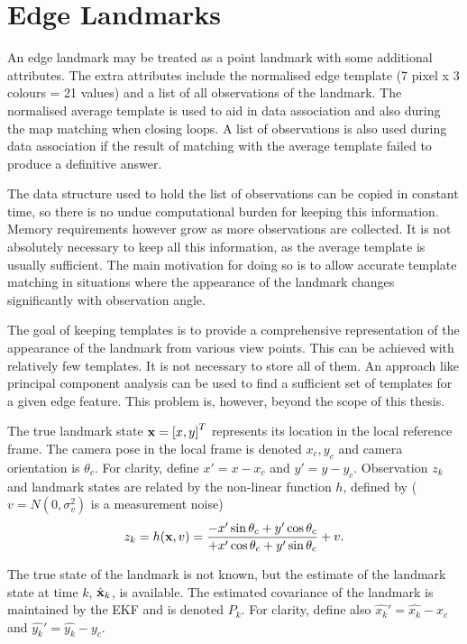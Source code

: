 \section{Edge Landmarks}

An edge landmark may be treated as a point landmark with some
additional attributes. The extra attributes include the normalised
edge template (7 pixel x 3 colours = 21 values) and a list of all
observations of the landmark.  The normalised average template is used
to aid in data association and also during the map matching when
closing loops. A list of observations is also used during data
association if the result of matching with the average template failed
to produce a definitive answer.

The data structure used to hold the list of observations can be copied
in constant time, so there is no undue computational burden for
keeping this information. Memory requirements however grow as more
observations are collected. It is not absolutely necessary to keep all
this information, as the average template is usually sufficient. The
main motivation for doing so is to allow accurate template matching in
situations where the appearance of the landmark changes significantly
with observation angle.

The goal of keeping templates is to provide a comprehensive
representation of the appearance of the landmark from various view
points. This can be achieved with relatively few templates. It is not
necessary to store all of them. An approach like principal component
analysis \cite{jolliffe2002pca} can be used to find a sufficient set
of templates for a given edge feature. This problem is, however, beyond
the scope of this thesis.

The true landmark state ${\bf x} = \left[x,y \right]^T$ represents its
location in the local reference frame. The camera pose in the local frame
is denoted $x_c,y_c$ and camera orientation is $\theta_c$. For clarity,
define $x'=x-x_c$ and $y'=y-y_c$. Observation $z_k$ and
landmark states are related by the non-linear function $h$, defined by
($v = N(0,\sigma_{v}^2)$ is a measurement noise)
$$
z_k = h({\bf x},v) =
\frac{-x'\sin \theta_c + y' \cos \theta_c }
     {+x'\cos \theta_c + y' \sin \theta_c } + v.
$$

The true state of the landmark is not known, but the estimate of the
landmark state at time $k$, $\hat{\bf x}_k$, is available. The
estimated covariance of the landmark is maintained by the EKF
and is denoted $P_k$. For clarity, define also
$\hat{x_k}'=\hat{x_k}-x_c$ and $\hat{y_k}'=\hat{y_k}-y_c$.


